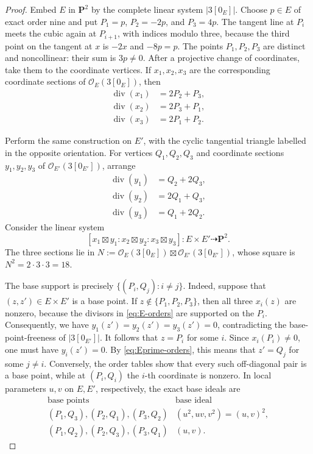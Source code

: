 \documentclass[12pt]{amsart}
\numberwithin{equation}{section}
\theoremstyle{definition}
\theoremstyle{remark}
\newcommand{\PP}{\mathbf P}
\newcommand{\cO}{\mathcal O}
\newcommand{\divisor}{\operatorname{div}}
\begin{document}
\begin{proof}
Embed $E$ in $\PP^2$ by the complete linear system $|3[0_E]|$.
Choose $p\in E$ of exact order nine and put
$P_1=p$, $P_2=-2p$, and $P_3=4p$.
The tangent line at $P_i$ meets the cubic again at $P_{i+1}$, with indices
modulo three, because the third point on the tangent at $x$ is $-2x$ and
$-8p=p$.  The points $P_1,P_2,P_3$ are distinct and noncollinear: their
sum is $3p\neq0$.  After a projective change of coordinates, take them to
the coordinate vertices.  If $x_1,x_2,x_3$ are the corresponding
coordinate sections of $\cO_E(3[0_E])$, then
\begin{equation}
\begin{aligned}
 \divisor(x_1)&=2P_2+P_3,\\
 \divisor(x_2)&=2P_3+P_1,\\
 \divisor(x_3)&=2P_1+P_2.
\end{aligned}
\label{eq:E-orders}
\end{equation}

Perform the same construction on $E'$, with the cyclic tangential triangle
labelled in the opposite orientation.  For vertices $Q_1,Q_2,Q_3$ and
coordinate sections $y_1,y_2,y_3$ of $\cO_{E'}(3[0_{E'}])$, arrange
\begin{equation}
\begin{aligned}
 \divisor(y_1)&=Q_2+2Q_3,\\
 \divisor(y_2)&=2Q_1+Q_3,\\
 \divisor(y_3)&=Q_1+2Q_2.
\end{aligned}
\label{eq:Eprime-orders}
\end{equation}
Consider the linear system
\[
  [x_1\boxtimes y_1:x_2\boxtimes y_2:x_3\boxtimes y_3]
  :E\times E'\dashrightarrow\PP^2.
\]
The three sections lie in
$N:=\cO_E(3[0_E])\boxtimes\cO_{E'}(3[0_{E'}])$, whose square is
$N^2=2\cdot3\cdot3=18$.

The base support is precisely $\{(P_i,Q_j):i\neq j\}$.
Indeed, suppose that $(z,z')\in E\times E'$ is a base point.  If
$z\notin\{P_1,P_2,P_3\}$, then all three $x_i(z)$ are nonzero, because
the divisors in \eqref{eq:E-orders} are supported on the $P_i$.
Consequently, we have $y_1(z')=y_2(z')=y_3(z')=0$, contradicting the
base-point-freeness of $|3[0_{E'}]|$.  It follows that $z=P_i$ for some
$i$.
Since $x_i(P_i)\neq0$, one must have $y_i(z')=0$.  By
\eqref{eq:Eprime-orders}, this means that $z'=Q_j$ for some $j\neq i$.
Conversely, the order tables show that every such off-diagonal pair is a
base point, while at $(P_i,Q_i)$ the $i$-th coordinate is nonzero.
In local parameters $u,v$
on $E,E'$, respectively, the exact base ideals are
\begin{equation}
\begin{array}{c|c}
\text{base points}&\text{base ideal}\\ \hline
(P_1,Q_3),(P_2,Q_1),(P_3,Q_2)&(u^2,uv,v^2)=(u,v)^2,\\
(P_1,Q_2),(P_2,Q_3),(P_3,Q_1)&(u,v).
\end{array}
\label{eq:product-ideals}
\end{equation}


\end{proof}
\end{document}
